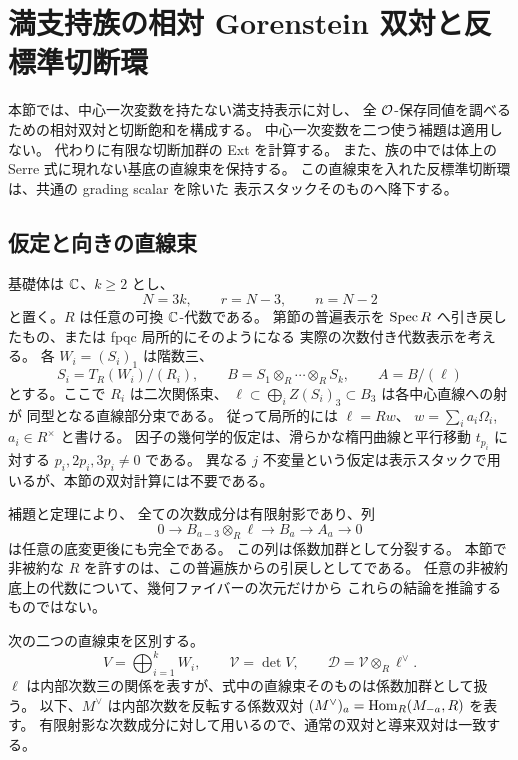 \section{満支持族の相対 Gorenstein 双対と反標準切断環}
\label{mbsd:sec:serre}

本節では、中心一次変数を持たない満支持表示に対し、
全 $\mathcal O$-保存同値を調べるための相対双対と切断飽和を構成する。
中心一次変数を二つ使う補題は適用しない。
代わりに有限な切断加群の Ext を計算する。
また、族の中では体上の Serre 式に現れない基底の直線束を保持する。
この直線束を入れた反標準切断環は、共通の grading scalar を除いた
表示スタックそのものへ降下する。

\subsection{仮定と向きの直線束}

基礎体は $\mathbb C$、$k\geq2$ とし、
\[
 N=3k,\qquad r=N-3,\qquad n=N-2
\]
と置く。$R$ は任意の可換 $\mathbb C$-代数である。
第節の普遍表示を
$\operatorname{Spec} R$ へ引き戻したもの、または fpqc 局所的にそのようになる
実際の次数付き代数表示を考える。
各 $W_i=(S_i)_1$ は階数三、
\[
 S_i=T_R(W_i)/(R_i),\qquad
 B=S_1\otimes_R\cdots\otimes_RS_k,\qquad
 A=B/(\ell)
\]
とする。ここで $R_i$ は二次関係束、
$\ell\subset\bigoplus_i Z(S_i)_3\subset B_3$ は各中心直線への射が
同型となる直線部分束である。
従って局所的には $\ell=Rw$、
$w=\sum_i a_i\Omega_i$, $a_i\in R^\times$ と書ける。
因子の幾何学的仮定は、滑らかな楕円曲線と平行移動 $t_{p_i}$ に対する
$p_i,2p_i,3p_i\ne0$ である。
異なる $j$ 不変量という仮定は表示スタックで用いるが、本節の双対計算には不要である。

補題と定理により、
全ての次数成分は有限射影であり、列
\begin{equation}\label{mbsd:eq:regular-line}
 0\longrightarrow B_{a-3}\otimes_R\ell
 \longrightarrow B_a\longrightarrow A_a\longrightarrow0
\end{equation}
は任意の底変更後にも完全である。
この列は係数加群として分裂する。
本節で非被約な $R$ を許すのは、この普遍族からの引戻しとしてである。
任意の非被約底上の代数について、幾何ファイバーの次元だけから
これらの結論を推論するものではない。

次の二つの直線束を区別する。
\begin{equation}\label{mbsd:eq:orientation}
 V=\bigoplus_{i=1}^kW_i,\qquad
 \mathscr V=\det V,\qquad
 \mathscr D=\mathscr V\otimes_R\ell^\vee.
\end{equation}
$\ell$ は内部次数三の関係を表すが、式中の直線束そのものは係数加群として扱う。
以下、$M^\vee$ は内部次数を反転する係数双対
$(M^\vee)_a=\operatorname{Hom}_R(M_{-a},R)$ を表す。
有限射影な次数成分に対して用いるので、通常の双対と導来双対は一致する。

